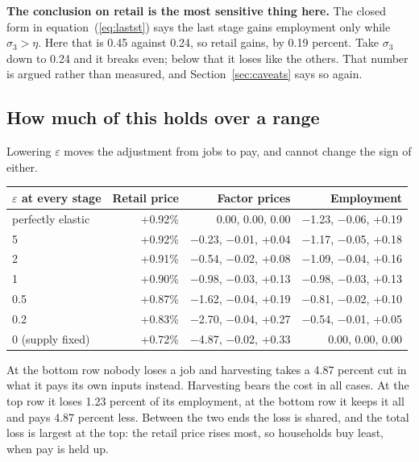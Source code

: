 \documentclass[11pt,a4paper]{article}
\begin{document}
\textbf{The conclusion on retail is the most sensitive thing here.} The closed form in equation~(\ref{eq:lastst}) says the last stage gains employment only while $\sigma_3 > \eta$. Here that is 0.45 against 0.24, so retail gains, by 0.19 percent. Take $\sigma_3$ down to 0.24 and it breaks even; below that it loses like the others. That number is argued rather than measured, and Section~\ref{sec:caveats} says so again.

\subsection{How much of this holds over a range}
\label{sec:range}

Lowering $\varepsilon$ moves the adjustment from jobs to pay, and cannot change the sign of either.

\begin{center}
\small
\begin{tabular}{lrrr}
\toprule
$\varepsilon$ at every stage & Retail price & Factor prices & Employment \\
\midrule
perfectly elastic & +0.92\% & \phantom{$-$}0.00, \phantom{$-$}0.00, \phantom{+}0.00 & $-$1.23, $-$0.06, +0.19 \\
5 & +0.92\% & $-$0.23, $-$0.01, +0.04 & $-$1.17, $-$0.05, +0.18 \\
2 & +0.91\% & $-$0.54, $-$0.02, +0.08 & $-$1.09, $-$0.04, +0.16 \\
1 & +0.90\% & $-$0.98, $-$0.03, +0.13 & $-$0.98, $-$0.03, +0.13 \\
0.5 & +0.87\% & $-$1.62, $-$0.04, +0.19 & $-$0.81, $-$0.02, +0.10 \\
0.2 & +0.83\% & $-$2.70, $-$0.04, +0.27 & $-$0.54, $-$0.01, +0.05 \\
0 (supply fixed) & +0.72\% & $-$4.87, $-$0.02, +0.33 & \phantom{$-$}0.00, \phantom{$-$}0.00, \phantom{+}0.00 \\
\bottomrule
\end{tabular}
\end{center}

At the bottom row nobody loses a job and harvesting takes a 4.87 percent cut in what it pays its own inputs instead. Harvesting bears the cost in all cases. At the top row it loses 1.23 percent of its employment, at the bottom row it keeps it all and pays 4.87 percent less. Between the two ends the loss is shared, and the total loss is largest at the top: the retail price rises most, so households buy least, when pay is held up.
\end{document}
